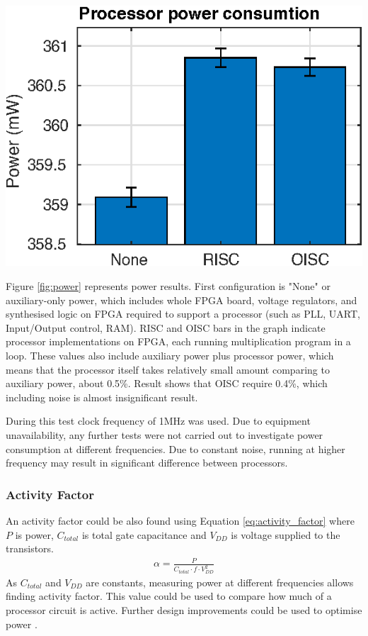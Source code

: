 \begin{colfigure}
	\centering
	\includegraphics[width=\linewidth]{../tests/power.eps}
	\label{fig:power}
\end{colfigure}

Figure \ref{fig:power} represents power results. First configuration is "None" or auxiliary-only power, which includes whole FPGA board, voltage regulators, and synthesised logic on FPGA required to support a processor (such as PLL, UART, Input/Output control, RAM). RISC and OISC bars in the graph indicate processor implementations on FPGA, each running multiplication program in a loop. These values also include auxiliary power plus processor power, which means that the processor itself takes relatively small amount comparing to auxiliary power, about 0.5\%. Result shows that OISC require 0.4\%, which including noise is almost insignificant result.

During this test clock frequency of 1MHz was used. Due to equipment unavailability, any further tests were not carried out to investigate power consumption at different frequencies. Due to constant noise, running at higher frequency may result in significant difference between processors.

\subsubsection{Activity Factor}\label{subsec:activity_factor}
An activity factor could be also found using Equation \ref{eq:activity_factor} where $P$ is power, $C_{total}$ is total gate capacitance and $V_{DD}$ is voltage supplied to the transistors.
\begin{align}\label{eq:activity_factor}
\alpha = \frac{P}{C_{total}\cdot f \cdot V_{DD}^2}
\end{align}
As $C_{total}$ and $V_{DD}$ are constants, measuring power at different frequencies allows finding activity factor. This value could be used to compare how much of a processor circuit is active. Further design improvements could be used to optimise power \autocite{8682289,7363689,1207041,6972455}.


